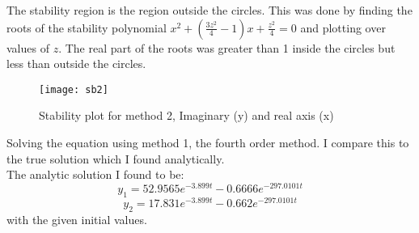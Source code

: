 \documentclass[]{article}
\title{}
\author{}
\date{}
\begin{document}
\maketitle
The stability region is the region outside the circles. This was done by finding the roots of the stability polynomial $ x^2 + (\frac{3z^2}{4}-1)x + \frac{z^2}{4} = 0 $ and plotting over values of $ z $. The real part of the roots was greater than 1 inside the circles but less than outside the circles. 
\begin{figure}[H]
	\caption{Stability plot for method 2, Imaginary (y) and real axis (x)}
	\centering
\texttt{[image: sb2]}	
\end{figure}

Solving the equation using method 1, the fourth order method. I compare this to the true solution which I found analytically. \\
The analytic solution I found to be: \\
\[ 
y_1 = 52.9565e^{-3.899t} -0.6666e^{-297.0101t}
\]
\[
y_2 = 17.831e^{-3.899t} -0.662e^{-297.0101t}
\]
with the given initial values. 
	
	
	
	
	
	
	
	
	
\end{document}
